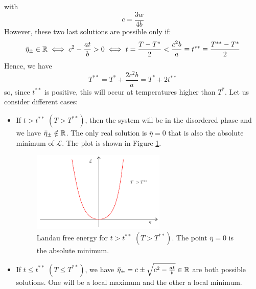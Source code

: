 \documentclass[../main/main.tex]{subfiles}
\begin{document}
with
\begin{equation*}
  c = \frac{3w}{4b}
\end{equation*}
However, these two last solutions are possible only if:
\begin{equation*}
  \bar{\eta }_{\pm} \in \mathbb{R} \iff c^2 - \frac{at}{b}>0  \iff t = \frac{T-T^*}{2} < \frac{c^2 b}{a} \equiv t^{**} \equiv  \frac{T^{**}-T^*}{2}
\end{equation*}
Hence, we have
\begin{equation*}
  T^{**} = T^* + \frac{2c^2b}{a} = T^* + 2t^{**}
\end{equation*}
so, since \( t^{**} \) is positive, this will occur at temperatures higher than \( T^* \).
Let us consider different cases:
\begin{itemize}
\item If \( t> t^{**} \) \( ( T > T^ {**}) \), then the system will be in the disordered phase and we have  \( \bar{\eta }_\pm \notin \mathbb{R}  \). The only real solution is \( \bar{\eta }=0  \) that is also the absolute minimum of \( \mathcal{L} \). The plot is shown in Figure \ref{fig:16_1}.
\begin{figure}[h!]
\centering
\includegraphics[width=0.6\textwidth]{../lessons/16_image/1.pdf}
\caption{\label{fig:16_1} Landau free energy for \( t> t^{**} \) \( ( T > T^ {**}) \). The point \( \bar{\eta }=0  \) is the absolute minimum.}
\end{figure}


\item If \( t \le t^{**} \) \( ( T \le T^ {**}) \), we have \( \bar{\eta }_\pm = c \pm \sqrt{c^2 - \frac{at}{b}} \in \mathbb{R}  \) are both possible solutions. One will be a local maximum and the other a local minimum.


\end{itemize}
\end{document}
